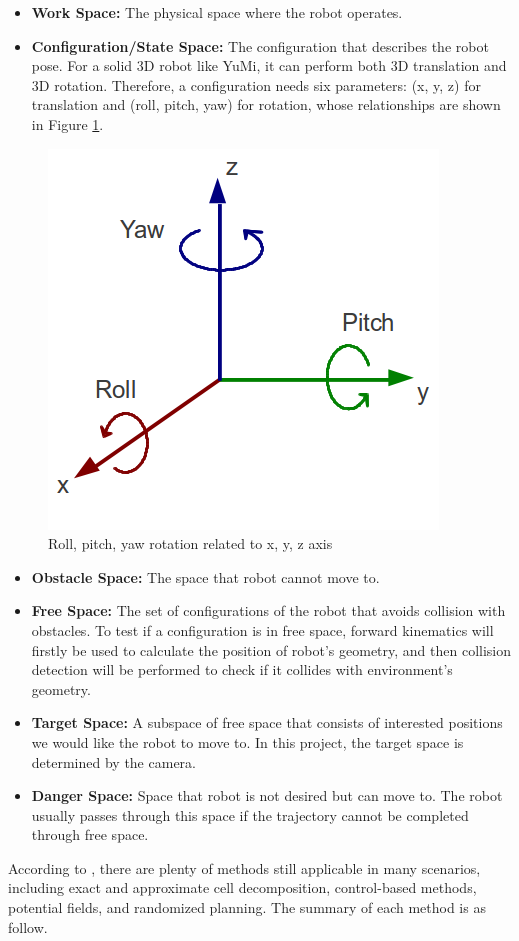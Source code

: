 \begin{itemize}
    \item \textbf{Work Space:} The physical space where the robot operates.
    \item \textbf{Configuration/State Space:} The configuration that describes the robot pose. For a solid 3D robot like YuMi, it can perform both 3D translation and 3D rotation. Therefore, a configuration needs six parameters: (x, y, z) for translation and (roll, pitch, yaw) for rotation, whose relationships are shown in Figure \ref{rpy}.
\end{itemize}

\begin{figure}[H]
\centering
\includegraphics[width = 0.4\columnwidth]{background/rpy.png}
\caption{Roll, pitch, yaw rotation related to x, y, z axis}
\label{rpy}
\end{figure}

\begin{itemize}
    \item \textbf{Obstacle Space:} The space that robot cannot move to. 
    \item \textbf{Free Space:} The set of configurations of the robot that avoids collision with obstacles. To test if a configuration is in free space, forward kinematics will firstly be used to calculate the position of robot's geometry, and then collision detection will be performed to check if it collides with environment's geometry.
    \item \textbf{Target Space:} A subspace of free space that consists of interested positions we would like the robot to move to. In this project, the target space is determined by the camera.
    \item \textbf{Danger Space:} Space that robot is not desired but can move to. The robot usually passes through this space if the trajectory cannot be completed through free space.
\end{itemize}

According to \citep{OMPLPrim20:online}, there are plenty of methods still applicable in many scenarios, including exact and approximate cell decomposition, control-based methods, potential fields, and randomized planning. The summary of each method is as follow.

